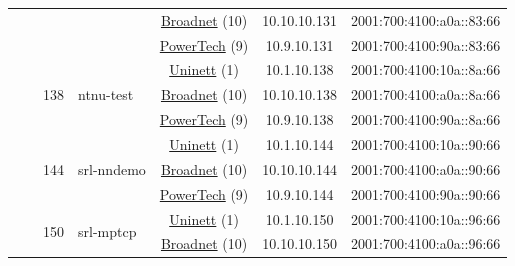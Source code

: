 \begin{small}
\begin{center}
\begin{longtable}{|c|c|c|c|c|c|c|c|}
  &  &  &  & \multicolumn{2}{|c|}{\tiny{\href{https://www.broadnet.no}{Broadnet} (10)}} & \tiny{10.10.10.131} & \tiny{2001:700:4100:a0a::83:66} \\* \cline{5-5}\cline{6-6}\cline{7-7}\cline{8-8}
  &  &  &  & \multicolumn{2}{|c|}{\tiny{\href{http://www.powertech.no}{PowerTech} (9)}} & \tiny{10.9.10.131} & \tiny{2001:700:4100:90a::83:66} \\* \cline{3-3}\cline{4-4}\cline{5-5}\cline{6-6}\cline{7-7}\cline{8-8}
  &  & \multirow{3}{*}{\tiny{138}} & \multicolumn{1}{|l|}{\multirow{3}{*}{\tiny{ntnu-test}}} & \multicolumn{2}{|c|}{\tiny{\href{https://www.uninett.no}{Uninett} (1)}} & \tiny{10.1.10.138} & \tiny{2001:700:4100:10a::8a:66} \\* \cline{5-5}\cline{6-6}\cline{7-7}\cline{8-8}
  &  &  &  & \multicolumn{2}{|c|}{\tiny{\href{https://www.broadnet.no}{Broadnet} (10)}} & \tiny{10.10.10.138} & \tiny{2001:700:4100:a0a::8a:66} \\* \cline{5-5}\cline{6-6}\cline{7-7}\cline{8-8}
  &  &  &  & \multicolumn{2}{|c|}{\tiny{\href{http://www.powertech.no}{PowerTech} (9)}} & \tiny{10.9.10.138} & \tiny{2001:700:4100:90a::8a:66} \\* \cline{3-3}\cline{4-4}\cline{5-5}\cline{6-6}\cline{7-7}\cline{8-8}
  &  & \multirow{3}{*}{\tiny{144}} & \multicolumn{1}{|l|}{\multirow{3}{*}{\tiny{srl-nndemo}}} & \multicolumn{2}{|c|}{\tiny{\href{https://www.uninett.no}{Uninett} (1)}} & \tiny{10.1.10.144} & \tiny{2001:700:4100:10a::90:66} \\* \cline{5-5}\cline{6-6}\cline{7-7}\cline{8-8}
  &  &  &  & \multicolumn{2}{|c|}{\tiny{\href{https://www.broadnet.no}{Broadnet} (10)}} & \tiny{10.10.10.144} & \tiny{2001:700:4100:a0a::90:66} \\* \cline{5-5}\cline{6-6}\cline{7-7}\cline{8-8}
  &  &  &  & \multicolumn{2}{|c|}{\tiny{\href{http://www.powertech.no}{PowerTech} (9)}} & \tiny{10.9.10.144} & \tiny{2001:700:4100:90a::90:66} \\* \cline{3-3}\cline{4-4}\cline{5-5}\cline{6-6}\cline{7-7}\cline{8-8}
  &  & \multirow{3}{*}{\tiny{150}} & \multicolumn{1}{|l|}{\multirow{3}{*}{\tiny{srl-mptcp}}} & \multicolumn{2}{|c|}{\tiny{\href{https://www.uninett.no}{Uninett} (1)}} & \tiny{10.1.10.150} & \tiny{2001:700:4100:10a::96:66} \\* \cline{5-5}\cline{6-6}\cline{7-7}\cline{8-8}
  &  &  &  & \multicolumn{2}{|c|}{\tiny{\href{https://www.broadnet.no}{Broadnet} (10)}} & \tiny{10.10.10.150} & \tiny{2001:700:4100:a0a::96:66} \\* \cline{5-5}\cline{6-6}\cline{7-7}\cline{8-8}

\end{longtable}
\end{center}
\end{small}
